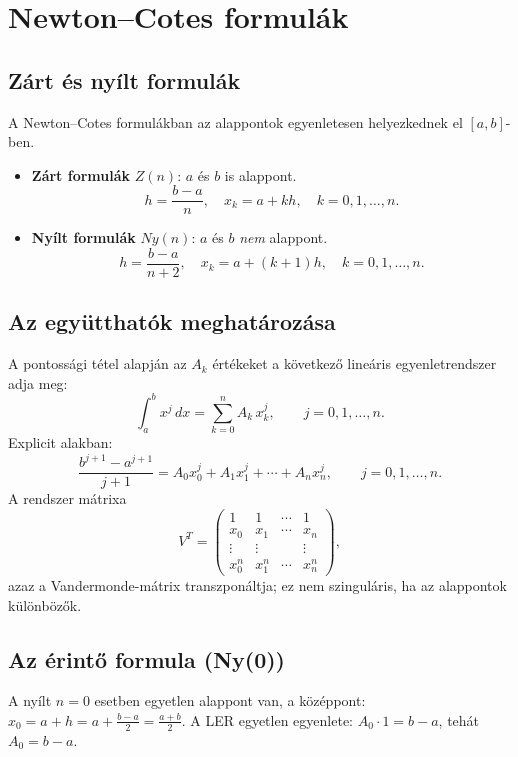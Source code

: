 \documentclass[a4paper,12pt]{article}
\theoremstyle{mydef}
\begin{document}
\section{Newton--Cotes formulák}
\label{sec:nc}

\subsection*{Zárt és nyílt formulák}

A Newton--Cotes formulákban az alappontok egyenletesen helyezkednek el $[a,b]$-ben.

\begin{itemize}[noitemsep,topsep=2pt]
  \item \textbf{Zárt formulák} $Z(n)$: $a$ és $b$ is alappont.
    \[
      h = \frac{b-a}{n}, \quad x_k = a + kh, \quad k = 0, 1, \ldots, n.
    \]
  \item \textbf{Nyílt formulák} $Ny(n)$: $a$ és $b$ \emph{nem} alappont.
    \[
      h = \frac{b-a}{n+2}, \quad x_k = a + (k+1)h, \quad k = 0, 1, \ldots, n.
    \]
\end{itemize}

\subsection*{Az együtthatók meghatározása}

A pontossági tétel alapján az $A_k$ értékeket a következő lineáris egyenletrendszer adja meg:
\[
  \int_a^b x^j\,dx = \sum_{k=0}^n A_k\,x_k^j, \qquad j = 0, 1, \ldots, n.
\]
Explicit alakban:
\[
  \frac{b^{j+1} - a^{j+1}}{j+1} = A_0 x_0^j + A_1 x_1^j + \cdots + A_n x_n^j,
  \qquad j = 0, 1, \ldots, n.
\]
A rendszer mátrixa
\[
  V^T =
  \begin{pmatrix}
    1 & 1 & \cdots & 1 \\
    x_0 & x_1 & \cdots & x_n \\
    \vdots & \vdots & & \vdots \\
    x_0^n & x_1^n & \cdots & x_n^n
  \end{pmatrix},
\]
azaz a Vandermonde-mátrix transzponáltja; ez nem szinguláris, ha az alappontok különbözők.

\subsection*{Az érintő formula (Ny(0))}

A nyílt $n=0$ esetben egyetlen alappont van, a középpont:
$x_0 = a + h = a + \tfrac{b-a}{2} = \tfrac{a+b}{2}$.
A LER egyetlen egyenlete: $A_0 \cdot 1 = b - a$, tehát $A_0 = b-a$.
\end{document}
